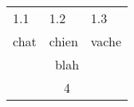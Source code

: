 \begin{tabular}{l|l|l} 
   1.1 & 1.2 & 1.3 \\
   chat & chien & vache \\
\multicolumn{3}{|c|}{blah}\\
\multicolumn{3}{|c|}{4}\\
\end{tabular}
